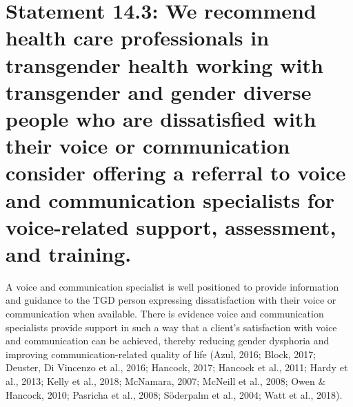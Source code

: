 \documentclass[
]{book}
\begin{document}
\hypertarget{statement-14.3-we-recommend-health-care-professionals-in-transgender-health-working-with-transgender-and-gender-diverse-people-who-are-dissatisfied-with-their-voice-or-communication-consider-offering-a-referral-to-voice-and-communication-specialists-for-voice-related-support-assessment-and-training.}{%
\section*{Statement 14.3: We recommend health care professionals in transgender health working with transgender and gender diverse people who are dissatisfied with their voice or communication consider offering a referral to voice and communication specialists for voice-related support, assessment, and training.}\label{statement-14.3-we-recommend-health-care-professionals-in-transgender-health-working-with-transgender-and-gender-diverse-people-who-are-dissatisfied-with-their-voice-or-communication-consider-offering-a-referral-to-voice-and-communication-specialists-for-voice-related-support-assessment-and-training.}}

A voice and communication specialist is well
positioned to provide information and guidance
to the TGD person expressing dissatisfaction
with their voice or communication when available. There is evidence voice and communication specialists provide support in such a way
that a client's satisfaction with voice and communication can be achieved, thereby reducing
gender dysphoria and improving
communication-related quality of life (Azul,
2016; Block, 2017; Deuster, Di Vincenzo et al.,
2016; Hancock, 2017; Hancock et al., 2011;
Hardy et al., 2013; Kelly et al., 2018; McNamara,
2007; McNeill et al., 2008; Owen \& Hancock,
2010; Pasricha et al., 2008; Söderpalm et al.,
2004; Watt et al., 2018).
\end{document}
